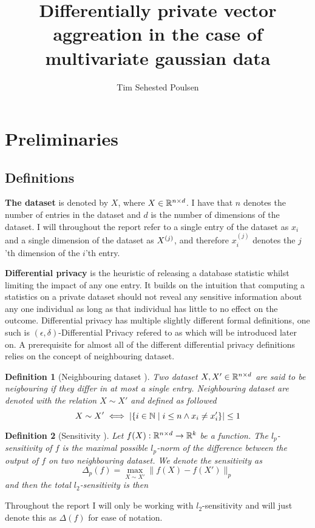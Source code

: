 \documentclass[a4paper,12pt]{article}
\title{Differentially private vector aggreation in the case of multivariate gaussian data}
\author{Tim Sehested Poulsen}
\newtheorem{definition}{Definition}[section]
\begin{document}
\maketitle

\section{Preliminaries}
\subsection{Definitions}

\textbf{The dataset} is denoted by $X$, where 
$X \in \mathbb{R}^{n \times d}$.
I have that $n$ denotes the number of entries in the dataset and 
$d$ is the number of dimensions of the dataset.
I will throughout the report refer to a single entry of 
the dataset as $x_i$ and a single dimension of the dataset as $X^{(j)}$, 
and therefore $x^{(j)}_i$
denotes the $j$'th dimension of the $i$'th entry.
\vspace*{0.3cm}

\textbf{Differential privacy} is the heuristic of 
releasing a database statistic whilst limiting the impact
of any one entry. It builds on the intuition that computing
a statistics on a private dataset should not reveal 
any sensitive information about any one individual 
as long as that individual has little to no effect on the outcome.
Differential privacy has multiple slightly different
formal definitions, 
one such is $(\epsilon, \delta)$-Differential Privacy
refered to as \edp which will be introduced later on.
A prerequisite for almost all of the different differential privacy
definitions relies on the concept of neighbouring dataset.
\vspace*{0.3cm}

\begin{definition}[Neighbouring dataset \cite{dwork2016}]
Two dataset $X, X' \in \mathbb{R}^{n \times d}$ are said to be 
neigbouring if they differ in at most a single entry.
Neighbouring dataset are denoted with the relation $X \sim X'$ and defined as followed
\[ X \sim X' \iff \left | \left \{ i \in \mathbb{N} \; \text{\textbar} \; i \le n \land x_i \ne x_i' \right\} \right| \le 1 \]
\end{definition}

\begin{definition}[Sensitivity \cite{dpbasic}] %
Let $f(X): \mathbb{R}^{n \times d} \rightarrow \mathbb{R}^k$ be a function. 
The $l_p$-sensitivity of $f$ is the maximal 
possible $l_p$-norm of the difference between the output of $f$ 
on two neighbouring dataset.
We denote the sensitivity as 
\[
\Delta_p (f) = \max_{X \sim X'} \| f(X) - f(X') \|_p 
\]
and then the total $l_2$-sensitivity is then
\end{definition}
Throughout the report I will only be working with $l_2$-sensitivity and
will just denote this as $\Delta(f)$ for ease of notation.
    
\end{document}
